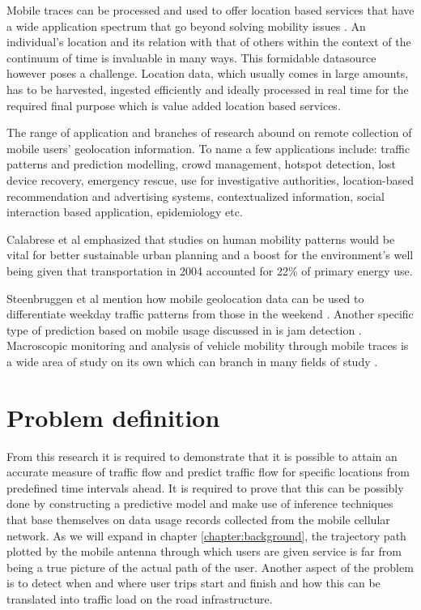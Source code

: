 \documentclass[12pt, a4paper]{report}
\theoremstyle{definition}
\theoremstyle{definition}%
\theoremstyle{definition}%
\theoremstyle{definition}%
\theoremstyle{definition}%
\theoremstyle{definition}%
\begin{document}
Mobile traces can be processed and used to offer location based services that have a wide application spectrum that go beyond solving mobility issues \cite{Hoteit2014,Calabrese2013,Gonzalez2008,Hoteit2016}. An individual's location and its relation with that of others within the context of the continuum of time is invaluable in many ways. This formidable datasource however poses a challenge. Location data, which usually comes in large amounts, has to be harvested, ingested efficiently and ideally processed in real time for the required final purpose which is value added location based services.

The range of application and branches of research abound on remote collection of mobile users' geolocation information.   To name a few applications include: traffic patterns and prediction modelling, crowd management, hotspot detection, lost device recovery, emergency rescue, use for investigative authorities,  location-based recommendation and advertising systems, contextualized information, social interaction based application, epidemiology etc.  

Calabrese et al  emphasized that studies on human mobility patterns would be vital for better sustainable urban planning and a boost for the environment's well being given that transportation in 2004 accounted for 22\% of primary energy use\cite{Calabrese2013}.

Steenbruggen et al mention how mobile geolocation data can be used to differentiate weekday traffic patterns from those in the weekend \cite{Steenbruggen2015}. Another specific type of  prediction based on mobile usage discussed in \cite{Hoteit2014} is jam detection .  Macroscopic monitoring and analysis of vehicle mobility through mobile traces is a wide area of study on its own which can branch in many fields of study \cite{Steenbruggen2015}.


\section{Problem definition}
From this research it is required to demonstrate that it is possible to attain an accurate measure of traffic flow and predict traffic flow for specific locations from predefined time intervals ahead. It is required to prove that this can be possibly done by constructing a predictive model and make use of inference techniques that base themselves on data usage records collected from the mobile cellular network. As we will expand in chapter \ref{chapter:background}, the trajectory path plotted by the mobile antenna through which users are given service is far from being a true picture of the actual path of the user.  Another aspect of the problem is to detect when and where user trips start and finish and how this can be translated into traffic load on the road infrastructure.
\end{document}
